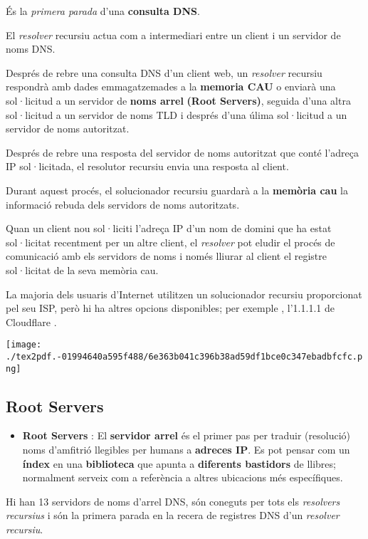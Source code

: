 \documentclass[]{article}
\providecommand{\tightlist}{%
  \setlength{\itemsep}{0pt}\setlength{\parskip}{0pt}}
\begin{document}
És la \emph{primera parada} d'una \textbf{consulta DNS}.

El \emph{resolver} recursiu actua com a intermediari entre un client i
un servidor de noms DNS.

Després de rebre una consulta DNS d'un client web, un \emph{resolver}
recursiu respondrà amb dades emmagatzemades a la \textbf{memoria CAU} o
enviarà una sol·licitud a un servidor de \textbf{noms arrel}
\textbf{(Root Servers)}, seguida d'una altra sol·licitud a un servidor
de noms TLD i després d'una úlima sol·licitud a un servidor de noms
autoritzat.

Després de rebre una resposta del servidor de noms autoritzat que conté
l'adreça IP sol·licitada, el resolutor recursiu envia una resposta al
client.

Durant aquest procés, el solucionador recursiu guardarà a la
\textbf{memòria cau} la informació rebuda dels servidors de noms
autoritzats.

Quan un client nou sol·liciti l'adreça IP d'un nom de domini que ha
estat sol·licitat recentment per un altre client, el \emph{resolver} pot
eludir el procés de comunicació amb els servidors de noms i només
lliurar al client el registre sol·licitat de la seva memòria cau.

La majoria dels usuaris d'Internet utilitzen un solucionador recursiu
proporcionat pel seu ISP, però hi ha altres opcions disponibles; per
exemple , l'1.1.1.1 de Cloudflare .

\texttt{[image: ./tex2pdf.-01994640a595f488/6e363b041c396b38ad59df1bce0c347ebadbfcfc.png]}

\hypertarget{root-servers}{%
\subsection{\texorpdfstring{\textbf{Root
Servers}}{Root Servers}}\label{root-servers}}

\begin{itemize}
\tightlist
\item
  \textbf{Root Servers} : El \textbf{servidor arrel} és el primer pas
  per traduir (resolució) noms d'amfitrió llegibles per humans a
  \textbf{adreces IP}. Es pot pensar com un \textbf{índex} en una
  \textbf{biblioteca} que apunta a \textbf{diferents bastidors} de
  llibres; normalment serveix com a referència a altres ubicacions més
  específiques.
\end{itemize}

Hi han 13 servidors de noms d'arrel DNS, són coneguts per tots els
\emph{resolvers recursius} i són la primera parada en la recera de
registres DNS d'un \emph{resolver recursiu}.
\end{document}
